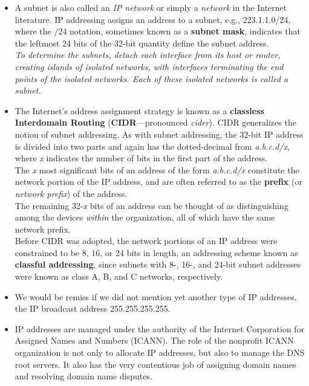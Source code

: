 \begin{itemize}
\item
A subnet is also called an \textit{IP network} or simply a \textit{network} in the Internet literature. IP addressing assigns an address to a subnet, e.g., 223.1.1.0/24, where the /24 notation, sometimes known as a \textbf{subnet mask}, indicates that the leftmost 24 bits of the 32-bit quantity define the subnet address.\\
\textit{To determine the subnets, detach each interface from its host or router, creating islands of isolated networks, with interfaces terminating the end points of the isolated networks. Each of these isolated networks is called a \textit{subnet}.}

\item
The Internet's address assignment strategy is known as a \textbf{classless Interdomain Routing} (\textbf{CIDR}---pronounced \textit{cider}). CIDR generalizes the notion of subnet addressing. As with subnet addressing, the 32-bit IP address is divided into two parts and again has the dotted-decimal from \textit{a.b.c.d/x}, where \textit{x} indicates the number of bits in the first part of the address.\\
The \textit{x} most significant bits of an address of the form \textit{a.b.c.d/x} constitute the network portion of the IP address, and are often referred to as the \textbf{prefix} (or \textit{network prefix}) of the address.\\
The remaining 32-\textit{x} bits of an address can be thought of as distinguishing among the devices \textit{within} the organization, all of which have the same network prefix.\\
Before CIDR was adopted, the network portions of an IP address were constrained to be 8, 16, or 24 bits in length, an addressing scheme known as \textbf{classful addressing}, since subnets with 8-, 16-, and 24-bit subnet addresses were known as class A, B, and C networks, respectively.

\item
We would be remiss if we did not mention yet another type of IP addresses, the IP broadcast address 255.255.255.255.

\item
IP addresses are managed under the authority of the Internet Corporation for Assigned Names and Numbers (ICANN). The role of the nonprofit ICANN organization is not only to allocate IP addresses, but also to manage the DNS root servers. It also has the very contentious job of assigning domain names and resolving domain name disputes.


\end{itemize}
